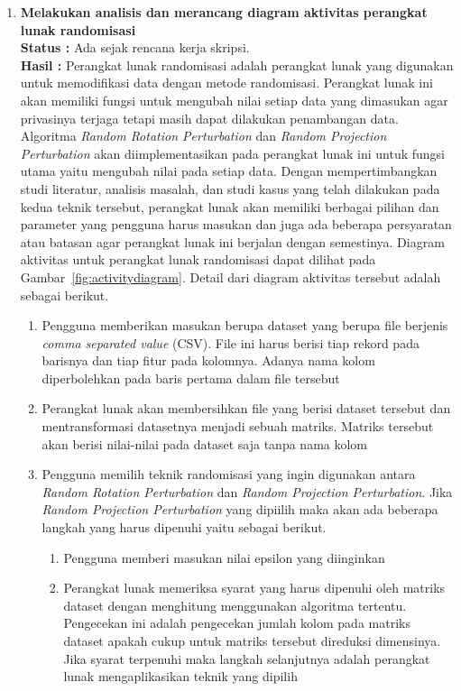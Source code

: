 \documentclass[a4paper,twoside]{article}
\begin{document}
\begin{enumerate}
		\item \textbf{Melakukan analisis dan merancang diagram aktivitas perangkat lunak randomisasi}\\
		{\bf Status :} Ada sejak rencana kerja skripsi.\\
		{\bf Hasil :} Perangkat lunak randomisasi adalah perangkat lunak yang digunakan untuk memodifikasi data dengan metode randomisasi. Perangkat lunak ini akan memiliki fungsi untuk mengubah nilai setiap data yang dimasukan agar privasinya terjaga tetapi masih dapat dilakukan penambangan data. Algoritma \textit{Random Rotation Perturbation} dan \textit{Random Projection Perturbation} akan diimplementasikan pada perangkat lunak ini untuk fungsi utama yaitu mengubah nilai pada setiap data. Dengan mempertimbangkan studi literatur, analisis masalah, dan studi kasus yang telah dilakukan pada kedua teknik tersebut, perangkat lunak akan memiliki berbagai pilihan dan parameter yang pengguna harus masukan dan juga ada beberapa persyaratan atau batasan agar perangkat lunak ini berjalan dengan semestinya. Diagram aktivitas untuk perangkat lunak randomisasi dapat dilihat pada Gambar~\ref{fig:activitydiagram}. Detail dari diagram aktivitas tersebut adalah sebagai berikut.
		\begin{enumerate}
			\item Pengguna memberikan masukan berupa dataset yang berupa file berjenis \textit{comma separated value} (CSV). File ini harus berisi tiap rekord pada barisnya dan tiap fitur pada kolomnya. Adanya nama kolom diperbolehkan pada baris pertama dalam file tersebut
			\item Perangkat lunak akan membersihkan file yang berisi dataset tersebut dan mentransformasi datasetnya menjadi sebuah matriks. Matriks tersebut akan berisi nilai-nilai pada dataset saja tanpa nama kolom
			\item Pengguna memilih teknik randomisasi yang ingin digunakan antara \textit{Random Rotation Perturbation} dan \textit{Random Projection Perturbation}. Jika \textit{Random Projection Perturbation} yang dipiilih maka akan ada beberapa langkah yang harus dipenuhi yaitu sebagai berikut.
			\begin{enumerate}
				\item Pengguna memberi masukan nilai epsilon yang diinginkan
				\item Perangkat lunak memeriksa syarat yang harus dipenuhi oleh matriks dataset dengan menghitung menggunakan algoritma tertentu. Pengecekan ini adalah pengecekan jumlah kolom pada matriks dataset apakah cukup untuk matriks tersebut direduksi dimensinya. Jika syarat terpenuhi maka langkah selanjutnya adalah perangkat lunak mengaplikasikan teknik yang dipilih

\end{enumerate}
\end{enumerate}
\end{enumerate}
\end{document}
